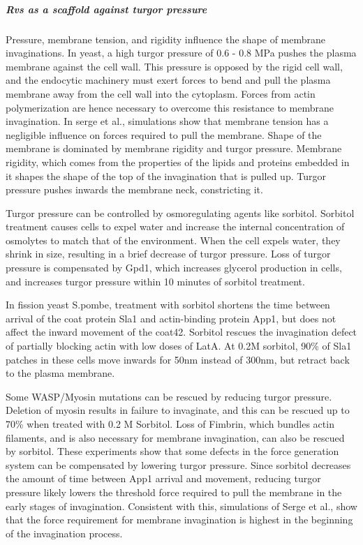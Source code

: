 	\subparagraph{Rvs as a scaffold against turgor pressure} 
	
Pressure, membrane tension, and rigidity influence the shape of membrane invaginations. In yeast, a high turgor pressure of 0.6 - 0.8 MPa pushes the plasma membrane against the cell wall. This pressure is opposed by the rigid cell wall, and the endocytic machinery must exert forces to bend and pull the plasma membrane away from the cell wall into the cytoplasm. Forces from actin polymerization are hence necessary to overcome this resistance to membrane invagination. In serge et al., simulations show that membrane tension has a negligible influence on forces required to pull the membrane. Shape of the membrane is dominated by membrane rigidity and turgor pressure. Membrane rigidity, which comes from the properties of the lipids and proteins embedded in it shapes the shape of the top of the invagination that is pulled up. Turgor pressure pushes inwards the membrane neck, constricting it. 

Turgor pressure can be controlled by osmoregulating agents like sorbitol. Sorbitol treatment causes cells to expel water and increase the internal concentration of osmolytes to match that of the environment. When the cell expels water, they shrink in size, resulting in a brief decrease of turgor pressure. Loss of turgor pressure is compensated by Gpd1, which increases glycerol production in cells, and increases turgor pressure within 10 minutes of sorbitol treatment.

In fission yeast S.pombe, treatment with sorbitol shortens the time between arrival of the coat protein Sla1 and actin-binding protein App1, but does not affect the inward movement of the coat42. Sorbitol rescues the invagination defect of partially blocking actin with low doses of LatA. At 0.2M sorbitol, 90\% of Sla1 patches in these cells move inwards for 50nm instead of 300nm, but retract back to the plasma membrane. 

Some WASP/Myosin mutations can be rescued by reducing turgor pressure. Deletion of myosin results in failure to invaginate, and this can be rescued up to 70\% when treated with 0.2 M Sorbitol. Loss of Fimbrin, which bundles actin filaments, and is also necessary for membrane invagination, can also be rescued by sorbitol.  These experiments show that some defects in the force generation system can be compensated by lowering turgor pressure.  Since sorbitol decreases the amount of time between App1 arrival and movement, reducing turgor pressure likely lowers the threshold force required to pull the membrane in the early stages of invagination. Consistent with this, simulations of Serge et al., show that the force requirement for membrane invagination is highest in the beginning of the invagination process. 

